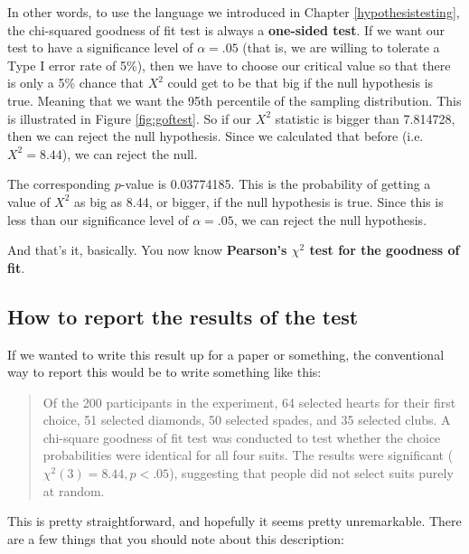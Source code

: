 \documentclass[
]{book}
\theoremstyle{definition}
\theoremstyle{definition}
\theoremstyle{definition}
\theoremstyle{definition}
\theoremstyle{remark}
\begin{document}
In other words, to use the language we introduced in Chapter \ref{hypothesistesting}, the chi-squared goodness of fit test is always a \textbf{one-sided test}. If we want our test to have a significance level of \(\alpha = .05\) (that is, we are willing to tolerate a Type I error rate of 5\%), then we have to choose our critical value so that there is only a 5\% chance that \(X^2\) could get to be that big if the null hypothesis is true. Meaning that we want the 95th percentile of the sampling distribution. This is illustrated in Figure \ref{fig:goftest}. So if our \(X^2\) statistic is bigger than 7.814728, then we can reject the null hypothesis. Since we calculated that before (i.e.~\(X^2 = 8.44\)), we can reject the null.

The corresponding \(p\)-value is 0.03774185. This is the probability of getting a value of \(X^2\) as big as 8.44, or bigger, if the null hypothesis is true. Since this is less than our significance level of \(\alpha = .05\), we can reject the null hypothesis.

And that's it, basically. You now know \textbf{Pearson's \(\chi^2\) test for the goodness of fit}.

\hypertarget{chisqreport}{%
\subsection{How to report the results of the test}\label{chisqreport}}

If we wanted to write this result up for a paper or something, the conventional way to report this would be to write something like this:

\begin{quote}
Of the 200 participants in the experiment, 64 selected hearts for their first choice, 51 selected diamonds, 50 selected spades, and 35 selected clubs. A chi-square goodness of fit test was conducted to test whether the choice probabilities were identical for all four suits. The results were significant (\(\chi^2(3) = 8.44, p<.05\)), suggesting that people did not select suits purely at random.
\end{quote}

This is pretty straightforward, and hopefully it seems pretty unremarkable. There are a few things that you should note about this description:
\end{document}
